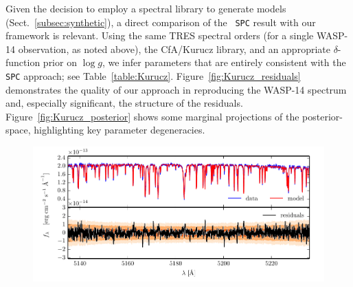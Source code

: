 \documentclass[iop,floatfix]{emulateapj}
\begin{document}
Given the decision to employ a spectral library to generate models (Sect.~\ref{subsec:synthetic}), 
a direct comparison of the \citeauthor{torres12}~{\tt SPC} result with our framework is relevant.  
Using the same TRES spectral orders (for a single WASP-14 observation, as noted above), the {\sc 
CfA/Kurucz} library, and an appropriate $\delta$-function prior on $\log g$, we infer parameters 
that are entirely consistent with the {\tt SPC} approach; see Table~\ref{table:Kurucz}.  
Figure~\ref{fig:Kurucz_residuals} demonstrates the quality of our approach in reproducing the 
WASP-14 spectrum and, especially significant, the structure of the residuals.  
Figure~\ref{fig:Kurucz_posterior} shows some marginal projections of the posterior-space, 
highlighting key parameter degeneracies.  

\begin{figure}[!t]
\includegraphics{figs/residuals_Kurucz_logg.pdf}
\end{figure}
\end{document}
